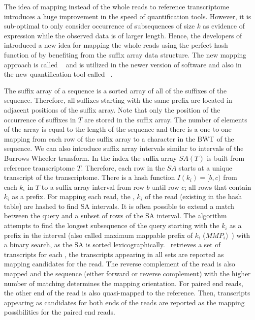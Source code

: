 The idea of mapping \kmers instead of the whole reads to reference transcriptome 
introduces a huge improvement in the speed of quantification tools. However, 
it is sub-optimal to only consider occurrence of subsequences of size $k$ as 
evidence of expression while the observed data is of larger length. Hence, 
the developers of \sailfish introduced a new idea for mapping the whole reads 
using the perfect hash function of \kmers by benefiting from the suffix array 
data structure. The new mapping approach is called \Qm~\citep{Srivastava2016rapmap} 
and is utilized in the newer version of \sailfish software and also in the new 
quantification tool called \salmon~\citep{Patro2017Salmon}. 

The suffix array of a sequence is a sorted array of all of the suffixes of the sequence. 
Therefore, all suffixes starting with the same prefix are located in adjacent 
positions of the suffix array. Note that only the position of the occurrence of 
suffixes in $T$ are stored in the suffix array. The number of elements of the 
array is equal to the length of the sequence and there is a one-to-one mapping 
from each row of the suffix array to a character in the BWT of the sequence. We 
can also introduce suffix array intervals similar to intervals of the 
Burrows-Wheeler transform. In the \qm index the suffix array $SA(T)$ is built from 
reference transcriptome $T$. Therefore, each row in the $SA$ starts at a unique 
transcript of the transcriptome. There is a hash function $I(k_i)=[b,c)$ from 
each \kmer $k_i$ in $T$ to a suffix array interval from row $b$ until row $c$; 
all rows that contain $k_i$ as a prefix. For mapping each read, the \kmers, $k_i$ 
of the read (existing in the hash table) are hashed to find SA intervals. It is 
often possible to extend a match between the query and a subset of rows of the SA 
interval. The \qm algorithm attempts to find the longest subsequence of the query 
starting with the $k_i$ as a prefix in the interval (also called maximum mappable 
prefix of $k_i$ ($MMP_i$)~\citep{Dobin2013Star}) with a binary search, as the SA 
is sorted lexicographically.~\citep{Srivastava2016rapmap}
\Qm retrieves a set of transcripts for each \kmer, the transcripts appearing 
in all sets are reported as mapping candidates for the read. The reverse 
complement of the read is also mapped and the sequence (either forward or 
reverse complement) with the higher number of matching \kmers determines the 
mapping orientation. For paired end reads, the other end of the read is also 
quasi-mapped to the reference. Then, transcripts appearing as candidates for 
both ends of the reads are reported as the mapping possibilities for the paired 
end reads.

